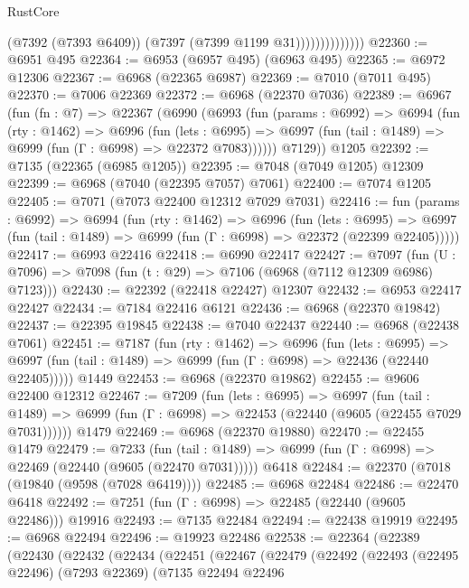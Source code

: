 \begin{lexlean}{RustCore}
\begin{coremodule}
                            (@7392 (@7393 @6409))
                            (@7397 (@7399 @1199 @31))))))))))))))
@22360 := @6951 @495
@22364 := @6953 (@6957 @495) (@6963 @495)
@22365 := @6972 @12306
@22367 := @6968 (@22365 @6987)
@22369 := @7010 (@7011 @495)
@22370 := @7006 @22369
@22372 := @6968 (@22370 @7036)
@22389 := @6967
    (fun (fn : @7) =>
    @22367
      (@6990
        (@6993
          (fun (params : @6992) =>
          @6994
            (fun (rty : @1462) =>
            @6996
              (fun (lets : @6995) =>
              @6997 (fun (tail : @1489) => @6999 (fun (Γ : @6998) => @22372 @7083))))))
        @7129))
    @1205
@22392 := @7135 (@22365 (@6985 @1205))
@22395 := @7048 (@7049 @1205) @12309
@22399 := @6968 (@7040 (@22395 @7057) @7061)
@22400 := @7074 @1205
@22405 := @7071 (@7073 @22400 @12312 @7029 @7031)
@22416 := fun (params : @6992) =>
  @6994
    (fun (rty : @1462) =>
    @6996
      (fun (lets : @6995) =>
      @6997 (fun (tail : @1489) => @6999 (fun (Γ : @6998) => @22372 (@22399 @22405)))))
@22417 := @6993 @22416
@22418 := @6990 @22417
@22427 := @7097
    (fun (U : @7096) => @7098 (fun (t : @29) => @7106 (@6968 (@7112 @12309 @6986) @7123)))
@22430 := @22392 (@22418 @22427) @12307
@22432 := @6953 @22417 @22427
@22434 := @7184 @22416 @6121
@22436 := @6968 (@22370 @19842)
@22437 := @22395 @19845
@22438 := @7040 @22437
@22440 := @6968 (@22438 @7061)
@22451 := @7187
    (fun (rty : @1462) =>
    @6996
      (fun (lets : @6995) =>
      @6997 (fun (tail : @1489) => @6999 (fun (Γ : @6998) => @22436 (@22440 @22405)))))
    @1449
@22453 := @6968 (@22370 @19862)
@22455 := @9606 @22400 @12312
@22467 := @7209
    (fun (lets : @6995) =>
    @6997
      (fun (tail : @1489) =>
      @6999 (fun (Γ : @6998) => @22453 (@22440 (@9605 (@22455 @7029 @7031))))))
    @1479
@22469 := @6968 (@22370 @19880)
@22470 := @22455 @1479
@22479 := @7233
    (fun (tail : @1489) => @6999 (fun (Γ : @6998) => @22469 (@22440 (@9605 (@22470 @7031)))))
    @6418
@22484 := @22370 (@7018 (@19840 (@9598 (@7028 @6419))))
@22485 := @6968 @22484
@22486 := @22470 @6418
@22492 := @7251 (fun (Γ : @6998) => @22485 (@22440 (@9605 @22486))) @19916
@22493 := @7135 @22484
@22494 := @22438 @19919
@22495 := @6968 @22494
@22496 := @19923 @22486
@22538 := @22364
    (@22389
      (@22430
        (@22432
          (@22434
            (@22451
              (@22467
                (@22479
                  (@22492
                    (@22493
                      (@22495 @22496)
                      (@7293 @22369)
                      (@7135
                        @22494
                        @22496

\end{coremodule}
\end{lexlean}

